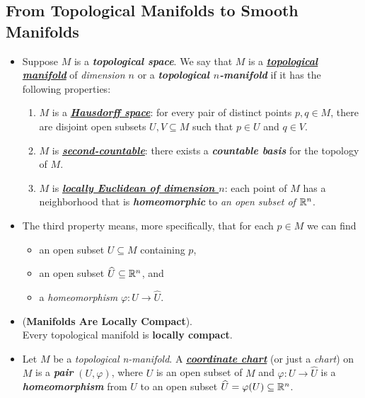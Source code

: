 \documentclass[11pt]{article}
\begin{document}
\subsection{From Topological Manifolds to Smooth Manifolds}
\begin{itemize}
\item \begin{definition}
Suppose $M$ is a \emph{\textbf{topological space}}. We say that $M$ is a \underline{\emph{\textbf{topological manifold}}} of \emph{dimension $n$} or a \emph{\textbf{topological $n$-manifold}} if it has the following properties:
\begin{enumerate}
\item $M$ is a \underline{\emph{\textbf{Hausdorff space}}}: for every pair of distinct points $p, q \in M$, there are disjoint open subsets $U, V \subseteq M$ such that $p \in U$ and $q \in V$.
\item $M$ is \underline{\emph{\textbf{second-countable}}}: there exists a \emph{\textbf{countable basis}} for the topology of $M$.
\item $M$ is \underline{\emph{\textbf{locally Euclidean of dimension $n$}}}: each point of $M$ has a neighborhood that is \emph{\textbf{homeomorphic}} to \emph{an open subset of ${\mathbb R}^n$}. 
\end{enumerate}
\end{definition}

\item The third property means, more specifically, that for each $p \in M$ we can find
\begin{itemize}
\item an open subset $U \subseteq M$ containing $p$,
\item an open subset $\widehat{U}\subseteq {\mathbb R}^n$, and
\item a \emph{homeomorphism} $\varphi: U\rightarrow \widehat{U}$.
\end{itemize}

\item  \begin{proposition} (\textbf{Manifolds Are Locally Compact}).\\
Every topological manifold is \textbf{locally compact}.
\end{proposition}

\item \begin{definition}
Let $M$ be a \emph{topological n-manifold}. A \underline{\emph{\textbf{coordinate chart}}} (or just a \emph{chart}) on $M$ is a \emph{\textbf{pair}} $(U, \varphi)$, where $U$ is an open subset of $M$ and $\varphi: U \rightarrow \widehat{U}$ is a \emph{\textbf{homeomorphism}} from $U$ to an open subset $\widehat{U} = \varphi(U) \subseteq {\mathbb R}^n$. 
\end{definition}


\end{itemize}
\end{document}
